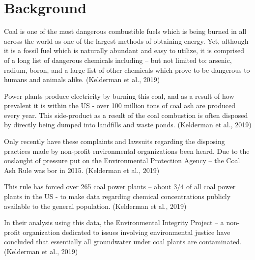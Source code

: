 \documentclass[12pt, twoside]{amherstthesis}
\begin{document}
\hypertarget{background}{%
\section{Background}\label{background}}

Coal is one of the most dangerous combustible fuels which is being burned in all across the world as one of the largest methods of obtaining energy. Yet, although it is a fossil fuel which is naturally abundant and easy to utilize, it is comprised of a long list of dangerous chemicals including -- but not limited to: arsenic, radium, boron, and a large list of other chemicals which prove to be dangerous to humans and animals alike. (Kelderman et al., 2019)

Power plants produce electricity by burning this coal, and as a result of how prevalent it is within the US - over 100 million tons of coal ash are produced every year. This side-product as a result of the coal combustion is often disposed by directly being dumped into landfills and waste ponds. (Kelderman et al., 2019)

Only recently have these complaints and lawsuits regarding the disposing practices made by non-profit environmental organizations been heard. Due to the onslaught of pressure put on the Environmental Protection Agency -- the Coal Ash Rule was bor in 2015. (Kelderman et al., 2019)

This rule has forced over 265 coal power plants -- about 3/4 of all coal power plants in the US - to make data regarding chemical concentrations publicly available to the general population. (Kelderman et al., 2019)

In their analysis using this data, the Environmental Integrity Project -- a non-profit organization dedicated to issues involving environmental justice have concluded that essentially all groundwater under coal plants are contaminated. (Kelderman et al., 2019)
\end{document}
